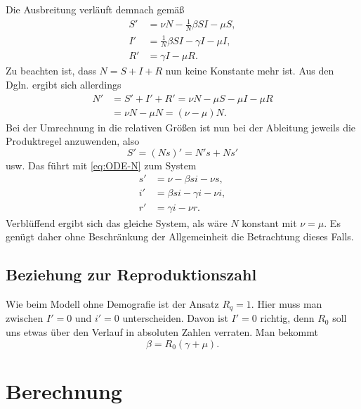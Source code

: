 \documentclass[a4paper,10pt,fleqn,twocolumn,twoside,dvipdfmx]{scrartcl}
\numberwithin{equation}{section}
\begin{document}
Die Ausbreitung verläuft demnach gemäß%
\begin{align}
S' &= \nu N - \tfrac{1}{N}\beta SI - \mu S,\\
I' &= \tfrac{1}{N}\beta SI - \gamma I - \mu I,\\
R' &= \gamma I - \mu R.
\end{align}
Zu beachten ist, dass $N=S+I+R$ nun keine Konstante mehr
ist. Aus den Dgln. ergibt sich allerdings
\begin{equation}\label{eq:ODE-N}
\begin{split}
N' &= S'+I'+R' = \nu N - \mu S - \mu I - \mu R\\
&= \nu N - \mu N = (\nu-\mu)N.
\end{split}
\end{equation}
Bei der Umrechnung in die relativen Größen ist nun bei der
Ableitung jeweils die Produktregel anzuwenden, also
\[S' = (Ns)' = N's + Ns'\]
usw. Das führt mit \eqref{eq:ODE-N} zum System
\begin{align}
s' &= \nu - \beta si - \nu s,\\
i' &= \beta si - \gamma i - \nu i,\\
r' &= \gamma i - \nu r.
\end{align}
Verblüffend ergibt sich das gleiche System, als wäre
$N$ konstant mit $\nu = \mu$. Es genügt daher ohne Beschränkung
der Allgemeinheit die Betrachtung dieses Falls.

\subsection{Beziehung zur Reproduktionszahl}

Wie beim Modell ohne Demografie ist der Ansatz $R_q = 1$.
Hier muss man zwischen $I'=0$ und $i'=0$ unterscheiden. Davon ist
$I'=0$ richtig, denn $R_0$ soll uns etwas über den Verlauf in
absoluten Zahlen verraten. Man bekommt
\begin{equation}
\beta = R_0(\gamma+\mu).
\end{equation}

\newpage
\section{Berechnung}
\end{document}
